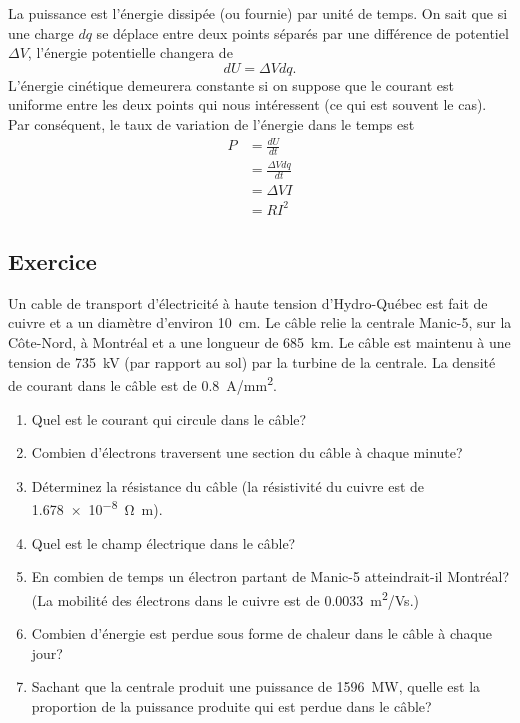 
La puissance est l'énergie dissipée (ou fournie) par unité de temps. On sait
que si une charge $dq$ se déplace entre deux points séparés par une différence de
potentiel $\Delta V$, l'énergie potentielle changera de
$$dU = \Delta V dq.$$
L'énergie cinétique demeurera constante si on suppose que le courant est
uniforme entre les deux points qui nous intéressent (ce qui est souvent le
cas). Par conséquent, le taux de variation de l'énergie dans le temps est
\begin{align*}
  P &= \frac{dU}{dt} \\
    &= \frac{\Delta V dq}{dt} \\
    &= \Delta V I \\
    &= RI^2
\end{align*}


\subsection*{Exercice}

Un cable de transport d'électricité à haute tension d'Hydro-Québec est fait de
cuivre et a un diamètre d'environ \SI{10}{cm}. Le câble relie la centrale
Manic-5, sur la Côte-Nord, à Montréal et a une longueur de \SI{685}{km}. Le
câble est maintenu à une tension de \SI{735}{kV} (par rapport au sol) par la
turbine de la centrale. La densité de courant dans le câble est de
\SI{0.8}{A/mm^2}.

\begin{enumerate}
  \item Quel est le courant qui circule dans le câble?
  \item Combien d'électrons traversent une section du câble à chaque minute?
  \item Déterminez la résistance du câble (la résistivité du cuivre est de
    \SI{1.678e-8}{\ohm\meter}).
  \item Quel est le champ électrique dans le câble?
  \item En combien de temps un électron partant de Manic-5 atteindrait-il
    Montréal? (La
    mobilité des électrons dans le cuivre est de \SI{0.0033}{m^2/Vs}.)
  \item Combien d'énergie est perdue sous forme de chaleur dans le câble à
    chaque jour?
  \item Sachant que la centrale produit une puissance de \SI{1596}{MW}, quelle
    est la proportion de la puissance produite qui est perdue dans le câble?
\end{enumerate}

